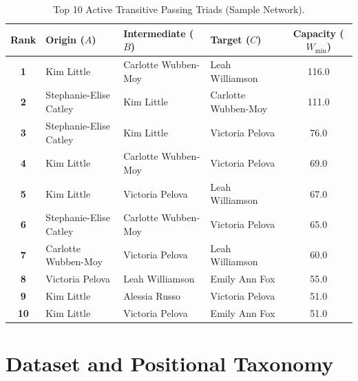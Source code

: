 \documentclass[12pt, a4paper]{article}
\begin{document}
\begin{table}[htbp]
    \centering
    \scriptsize
    \caption{Top 10 Active Transitive Passing Triads (Sample Network).}
    \label{tab:app_empirical_triads}
    \begin{tabularx}{\textwidth}{c X X X c}
        \toprule
        \textbf{Rank} & \textbf{Origin ($A$)} & \textbf{Intermediate ($B$)} & \textbf{Target ($C$)} & \textbf{Capacity ($W_{\text{min}}$)} \\
        \midrule
        \textbf{1} & Kim Little & Carlotte Wubben-Moy & Leah Williamson & 116.0 \\
        \textbf{2} & Stephanie-Elise Catley & Kim Little & Carlotte Wubben-Moy & 111.0 \\
        \textbf{3} & Stephanie-Elise Catley & Kim Little & Victoria Pelova & 76.0 \\
        \textbf{4} & Kim Little & Carlotte Wubben-Moy & Victoria Pelova & 69.0 \\
        \textbf{5} & Kim Little & Victoria Pelova & Leah Williamson & 67.0 \\
        \textbf{6} & Stephanie-Elise Catley & Carlotte Wubben-Moy & Victoria Pelova & 65.0 \\
        \textbf{7} & Carlotte Wubben-Moy & Victoria Pelova & Leah Williamson & 60.0 \\
        \textbf{8} & Victoria Pelova & Leah Williamson & Emily Ann Fox & 55.0 \\
        \textbf{9} & Kim Little & Alessia Russo & Victoria Pelova & 51.0 \\
        \textbf{10} & Kim Little & Victoria Pelova & Emily Ann Fox & 51.0 \\
        \bottomrule
    \end{tabularx}
\end{table}


\clearpage
\section{Dataset and Positional Taxonomy}
\label{app:positional_taxonomy}
\end{document}
